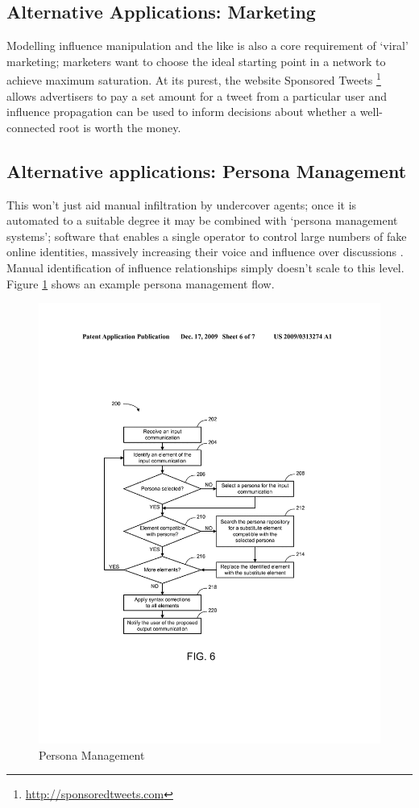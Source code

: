 \subsection{Alternative Applications: Marketing}
Modelling influence manipulation and the like is also a core requirement of
`viral' marketing; marketers want to choose the ideal starting point in a
network to achieve maximum saturation. At its purest, the website
Sponsored Tweets \footnote{\url{http://sponsoredtweets.com}} allows advertisers to pay a set amount for a tweet from a particular user and influence propagation can be used to inform decisions
about whether a well-connected root is worth the money. 

\subsection{Alternative applications: Persona Management}
This won't just aid manual infiltration by undercover agents; once it is
automated to a suitable degree it may be combined with `persona management
systems'; software that enables a single operator to control large numbers of
fake online identities, massively increasing their voice and influence over
discussions \cite{personaPatent}. Manual identification of influence relationships simply doesn't
scale to this level. Figure \ref{fig:persona_management_workflow} shows an
example persona management flow.


\begin{figure}[htbp]
    \centering
    \includegraphics[width=0.7\linewidth]{img/persona_management_flow.png}
    \caption{Persona Management}
    \label{fig:persona_management_workflow}
\end{figure}



% 

